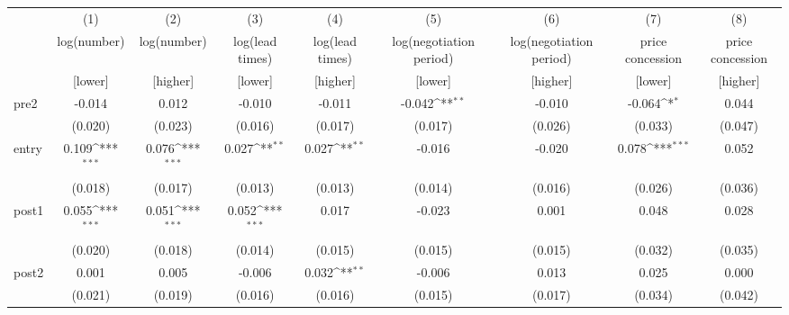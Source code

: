 {
\def\sym#1{\ifmmode^{#1}\else\(^{#1}\)\fi}
\begin{adjustbox}{max width=\textwidth}
\begin{tabular}{l*{8}{c}}
\toprule
            &\multicolumn{1}{c}{(1)}&\multicolumn{1}{c}{(2)}&\multicolumn{1}{c}{(3)}&\multicolumn{1}{c}{(4)}&\multicolumn{1}{c}{(5)}&\multicolumn{1}{c}{(6)}&\multicolumn{1}{c}{(7)}&\multicolumn{1}{c}{(8)}\\
            &\multicolumn{1}{c}{log(number)}&\multicolumn{1}{c}{log(number)}&\multicolumn{1}{c}{log(lead times)}&\multicolumn{1}{c}{log(lead times)}&\multicolumn{1}{c}{log(negotiation period)}&\multicolumn{1}{c}{log(negotiation period)}&\multicolumn{1}{c}{price concession}&\multicolumn{1}{c}{price concession}\\
&[lower]&[higher]&[lower]&[higher]&[lower]&[higher]&[lower]&[higher]\\
\midrule
pre2        &      -0.014         &       0.012         &      -0.010         &      -0.011         &      -0.042\sym{**} &      -0.010         &      -0.064\sym{*}  &       0.044         \\
            &     (0.020)         &     (0.023)         &     (0.016)         &     (0.017)         &     (0.017)         &     (0.026)         &     (0.033)         &     (0.047)         \\
\addlinespace
entry       &       0.109\sym{***}&       0.076\sym{***}&       0.027\sym{**} &       0.027\sym{**} &      -0.016         &      -0.020         &       0.078\sym{***}&       0.052         \\
            &     (0.018)         &     (0.017)         &     (0.013)         &     (0.013)         &     (0.014)         &     (0.016)         &     (0.026)         &     (0.036)         \\
\addlinespace
post1       &       0.055\sym{***}&       0.051\sym{***}&       0.052\sym{***}&       0.017         &      -0.023         &       0.001         &       0.048         &       0.028         \\
            &     (0.020)         &     (0.018)         &     (0.014)         &     (0.015)         &     (0.015)         &     (0.015)         &     (0.032)         &     (0.035)         \\
\addlinespace
post2       &       0.001         &       0.005         &      -0.006         &       0.032\sym{**} &      -0.006         &       0.013         &       0.025         &       0.000         \\
            &     (0.021)         &     (0.019)         &     (0.016)         &     (0.016)         &     (0.015)         &     (0.017)         &     (0.034)         &     (0.042)         \\

\end{tabular}
\end{adjustbox}}
